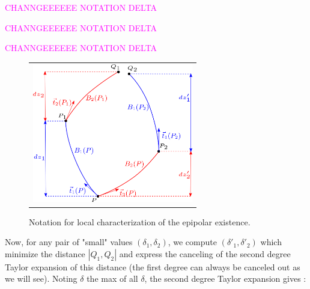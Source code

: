 \documentclass{ipol}
\newcommand{\mpd}[1]{\textcolor{magenta}{#1}}
\begin{document}
\mpd{CHANNGEEEEEE    NOTATION DELTA}

\mpd{CHANNGEEEEEE    NOTATION DELTA}

\mpd{CHANNGEEEEEE    NOTATION DELTA}


\begin{figure}
\centering
\begin{tabular}{c}
\includegraphics[width=7cm]{FIGS/EquadifEpip.png}
\end{tabular}
\caption{Notation for local characterization of the epipolar existence.}
\label{EqDifEpip}
\end{figure}

Now, for any pair of "small" values $(\delta_1,\delta_2)$,  we  compute 
$(\delta'_1,\delta'_2)$ which minimize the distance $|Q_1,Q_2|$ and express the canceling of the
second degree Taylor expansion of this distance (the first degree can always be canceled out as we will see).  Noting $\delta$ the max of all $\delta$, the second degree Taylor expansion gives :
\end{document}
